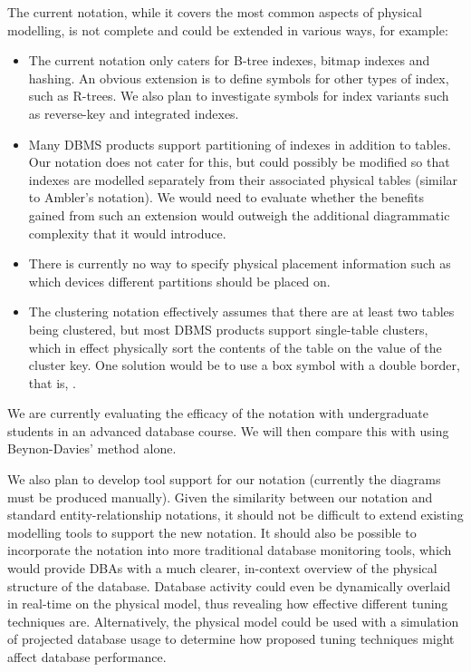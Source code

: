 \documentclass{CRPITStyle}
\begin{document}
The current notation, while it covers the most common aspects of
physical modelling, is not complete and could be extended in various
ways, for example:
\begin{itemize}

	\item The current notation only caters for B-tree indexes, bitmap
	indexes and hashing. An obvious extension is to define symbols for
	other types of index, such as R-trees. We also plan to investigate
	symbols for index variants such as reverse-key and integrated
	indexes.
	
	\item Many DBMS products support partitioning of indexes in addition
	to tables. Our notation does not cater for this, but could possibly
	be modified so that indexes are modelled separately from their
	associated physical tables (similar to Ambler's notation). We would
	need to evaluate whether the benefits gained from such an extension
	would outweigh the additional diagrammatic complexity that it would
	introduce.
	
	\item There is currently no way to specify physical placement
	information such as which devices different partitions should be
	placed on.
	
	\item The clustering notation effectively assumes that there are at
	least two tables being clustered, but most DBMS products support
	single-table clusters, which in effect physically sort the contents
	of the table on the value of the cluster key. One solution would be
	to use a box symbol with a double border, that is,
	\fbox{\fbox{\mbox{}}}.
	
\end{itemize}

We are currently evaluating the efficacy of the notation with
undergraduate students in an advanced database course. We will then
compare this with using Beynon-Davies' method alone.

We also plan to develop tool support for our notation (currently the
diagrams must be produced manually). Given the similarity between our
notation and standard entity-relationship notations, it should not be
difficult to extend existing modelling tools to support the new
notation. It should also be possible to incorporate the notation into
more traditional database monitoring tools, which would provide DBAs
with a much clearer, in-context overview of the physical structure of
the database. Database activity could even be dynamically overlaid in
real-time on the physical model, thus revealing how effective different
tuning techniques are. Alternatively, the physical model could be used
with a simulation of projected database usage to determine how proposed
tuning techniques might affect database performance.
\end{document}
